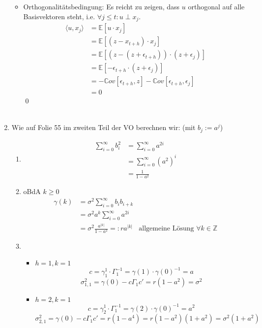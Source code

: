 \documentclass[a4paper,11pt,notitlepage,fullpage]{article}
\newcommand{\E}[1]{\mathbb E\left[#1\right]}
\newcommand{\Cov}[1]{\mathbb Cov\left[#1\right]}
\begin{document}
\begin{enumerate}
\begin{itemize}
\item Orthogonalitätsbedingung: Es reicht zu zeigen, dass $u$ orthogonal auf alle Basisvektoren steht, i.e. $\forall j \leq t : u\perp x_j$.
\begin{align*}
\langle u, x_j \rangle &= \E{u\cdot x_j} \\
&= \E{(z - x_{t+h}) \cdot x_j} \\
&= \E{(z - (z + \epsilon_{t+h})) \cdot (z + \epsilon_j)} \\
&= \E{-\epsilon_{t+h} \cdot (z + \epsilon_j)} \\
&= - \Cov{\epsilon_{t+h}, z} - \Cov{\epsilon_{t+h}, \epsilon_j} \\
&= 0
\end{align*}\qed
\end{itemize}
\begin{align*}
\end{align*}



\item Wie auf Folie 55 im zweiten Teil der VO berechnen wir: (mit $b_j := a^j$)
\begin{enumerate}
\item
\begin{align*}
\sum_{i = 0}^\infty b_i^2 &= \sum_{i = 0}^\infty a^{2i} \\
&= \sum_{i = 0}^\infty (a^2)^i \\
&= \frac{1}{1-a^2}
\end{align*}

\item oBdA $k \geq 0$
\begin{align*}
\gamma(k) &= \sigma^2 \sum_{i = 0}^\infty b_i b_{i+k} \\
&= \sigma^2 a^k \sum_{i = 0}^\infty a^{2i} \\
&= \sigma^2 \frac{a^{|k|}}{1-a^2} =: r a^{|k|} &\text{allgemeine Lösung }\forall k \in \mathbb Z
\end{align*}

\item 
\begin{itemize}
\item $h = 1, k = 1$
$$
c = \gamma_1^1 \cdot \Gamma_1^{-1} = \gamma(1) \cdot \gamma(0)^{-1} = a
$$$$
\sigma_{1,1}^2 = \gamma(0) - c\Gamma_1 c' = r(1-a^2) = \sigma^2
$$

\item $h = 2, k = 1$
$$
c = \gamma_2^1 \cdot \Gamma_1^{-1} = \gamma(2) \cdot \gamma(0)^{-1} = a^2
$$$$
\sigma_{2,1}^2 = \gamma(0) - c\Gamma_1 c' = r(1-a^4) = r(1-a^2)(1+a^2) = \sigma^2(1+a^2)
$$


\end{itemize}
\end{enumerate}
\end{enumerate}
\end{document}

